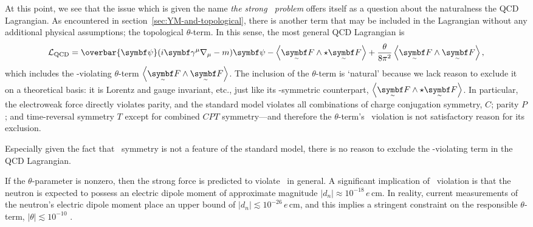 At this point, we see that the issue which is given the name \emph{the strong \CP\ problem} offers itself as a question about the naturalness the QCD Lagrangian.
As encountered in section~\ref{sec:YM-and-topological}, there is another term that may be included in the Lagrangian without any additional physical assumptions; the topological $\theta$-term.
In this sense, the most general QCD Lagrangian is
\begin{align}
	\cal L_\text{QCD} = \overbar{\bm\psi}\qty(i\bm\gamma^\mu\nabla_\mu - m)\bm\psi
	- \ang{\tsbm F \wedge\star \tsbm F}
	+ \frac{\theta}{8\pi^2}\ang{\tsbm F \wedge \tsbm F}
,\end{align}
which includes the \CP-violating $\theta$-term $\ang{\tsbm F\wedge\tsbm F}$.
The inclusion of the $\theta$-term is `natural' because we lack reason to exclude it on a theoretical basis: it is Lorentz and gauge invariant, etc., just like its \CP-symmetric counterpart, $\ang{\tsbm F \wedge\star\tsbm F}$.
In particular, the electroweak force directly violates parity, and the standard model violates all combinations of charge conjugation symmetry, $C$; parity $P$; and time-reversal symmetry $T$ except for combined $CPT$ symmetry---and therefore the $\theta$-term's \CP\ violation is not satisfactory reason for its exclusion.

Especially given the fact that \CP\ symmetry is not a feature of the standard model, there is no reason to exclude the \CP-violating term in the QCD Lagrangian.


If the $\theta$-parameter is nonzero, then the strong force is predicted to violate \CP\ in general.
A significant implication of \CP\ violation is that the neutron is expected to possess an electric dipole moment of approximate magnitude $|d_n| \approx 10^{-18} \,e\,\mathrm{cm}$.
In reality, current measurements \cite{electric_dipole_neutron_2020} of the neutron's electric dipole moment place an upper bound of $|d_n| \lesssim 10^{-26} \,e\,\mathrm{cm}$, and this implies a stringent constraint on the responsible $\theta$-term, $|\theta| \lesssim 10^{-10}$ \cite{Review_2018}.

